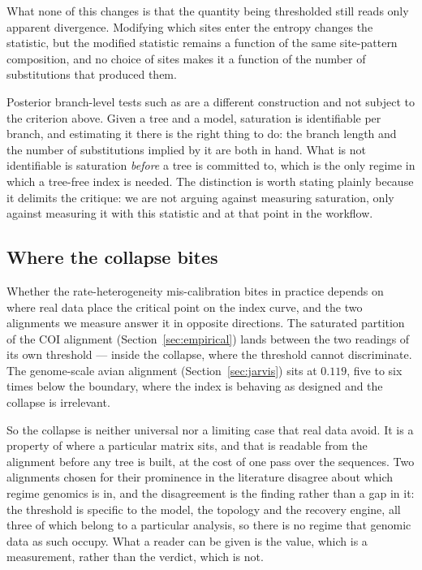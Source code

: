\documentclass[preprint,12pt,authoryear]{elsarticle}
\theoremstyle{definition}
\theoremstyle{remark}
\begin{document}
What none of this changes is that the quantity being thresholded still reads
only apparent divergence. Modifying which sites enter the entropy changes the
statistic, but the modified statistic remains a function of the same
site-pattern composition, and no choice of sites makes it a function of the
number of substitutions that produced them.

Posterior branch-level tests such as \citet{manuel2025satute} are a different
construction and not subject to the criterion above. Given a tree and a model,
saturation is identifiable per branch, and estimating it there is the right
thing to do: the branch length and the number of substitutions implied by it
are both in hand. What is not identifiable is saturation \emph{before} a tree
is committed to, which is the only regime in which a tree-free index is
needed. The distinction is worth stating plainly because it delimits the
critique: we are not arguing against measuring saturation, only against
measuring it with this statistic and at that point in the workflow.

\subsection{Where the collapse bites}
\label{sec:open}

Whether the rate-heterogeneity mis-calibration bites in practice depends on
where real data place the critical point on the index curve, and the two
alignments we measure answer it in opposite directions. The saturated
partition of the COI alignment
(Section~\ref{sec:empirical}) lands between the two readings of its own
threshold --- inside the collapse, where the threshold cannot discriminate. The
genome-scale avian alignment
(Section~\ref{sec:jarvis}) sits at $0.119$, five to six times below the
boundary, where the index is behaving as designed and the collapse is
irrelevant.

So the collapse is neither universal nor a limiting case that real data
avoid. It is a property of where a particular matrix sits, and that is
readable from the alignment before any tree is built, at the cost of one pass
over the sequences. Two alignments chosen for their prominence in the
literature disagree about which regime genomics is in, and the disagreement
is the finding rather than a gap in it: the threshold is specific to the
model, the topology and the recovery engine, all three of which belong to a
particular analysis, so there is no regime that genomic data as such occupy.
What a reader can be given is the value, which is a measurement, rather than
the verdict, which is not.
\end{document}
